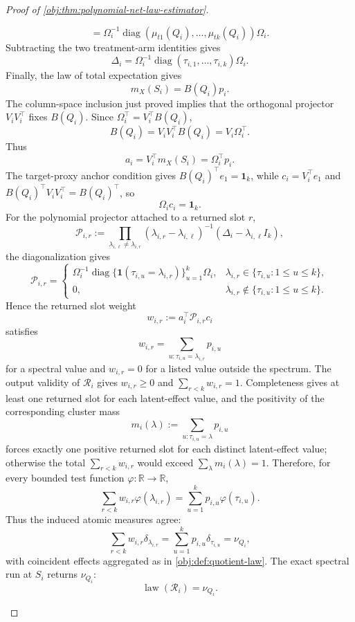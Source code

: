 \documentclass[11pt]{article}
\begin{document}
\begin{proof}[Proof of \cref{obj:thm:polynomial-net-law-estimator}]
\begin{enumerate}
\[=
\Omega_i^{-1}
\operatorname{diag}(\mu_{t1}(Q_i),\ldots,\mu_{tk}(Q_i))\Omega_i .
\]
Subtracting the two treatment-arm identities gives
\[
\Delta_i
=
\Omega_i^{-1}
\operatorname{diag}(\tau_{i,1},\ldots,\tau_{i,k})
\Omega_i .
\]
Finally, the law of total expectation gives
\[
m_X(S_i)=B(Q_i)p_i .
\]
The column-space inclusion just proved implies that the orthogonal projector
\(V_iV_i^\top\) fixes \(B(Q_i)\).  Since
\(\Omega_i^\top=V_i^\top B(Q_i)\),
\[
B(Q_i)=V_iV_i^\top B(Q_i)=V_i\Omega_i^\top .
\]
Thus
\[
a_i=V_i^\top m_X(S_i)=\Omega_i^\top p_i .
\]
The target-proxy anchor condition gives \(B(Q_i)^\top e_1=\mathbf 1_k\), while
\(c_i=V_i^\top e_1\) and \(B(Q_i)^\top V_iV_i^\top=B(Q_i)^\top\), so
\[
\Omega_i c_i=\mathbf 1_k .
\] %
For the polynomial projector attached to a returned slot \(r\),
\[
\mathcal P_{i,r}
:=
\prod_{\lambda_{i,\ell}\ne\lambda_{i,r}}
(\lambda_{i,r}-\lambda_{i,\ell})^{-1}
(\Delta_i-\lambda_{i,\ell}I_k),
\]
the diagonalization gives
\[
\mathcal P_{i,r}
=
\begin{cases}
\Omega_i^{-1}
\operatorname{diag}\{\mathbf 1(\tau_{i,u}=\lambda_{i,r})\}_{u=1}^k
\Omega_i,
&\lambda_{i,r}\in\{\tau_{i,u}:1\le u\le k\},\\
0,&\lambda_{i,r}\notin\{\tau_{i,u}:1\le u\le k\}.
\end{cases}
\]
Hence the returned slot weight
\[
w_{i,r}:=a_i^\top\mathcal P_{i,r}c_i
\]
satisfies
\[
w_{i,r}
=
\sum_{u:\tau_{i,u}=\lambda_{i,r}}p_{i,u}
\]
for a spectral value and \(w_{i,r}=0\) for a listed value outside the spectrum.
The output validity of \(\mathcal R_i\) gives \(w_{i,r}\ge0\) and
\(\sum_{r<k}w_{i,r}=1\).  Completeness gives at least one returned slot for
each latent-effect value, and the positivity of the corresponding cluster mass
\[
m_i(\lambda):=\sum_{u:\tau_{i,u}=\lambda}p_{i,u}
\]
forces exactly one positive returned slot for each distinct latent-effect
value; otherwise the total \(\sum_{r<k}w_{i,r}\) would exceed
\(\sum_{\lambda}m_i(\lambda)=1\).  Therefore, for every bounded test function
\(\varphi:\mathbb R\to\mathbb R\),
\[
\sum_{r<k}w_{i,r}\varphi(\lambda_{i,r})
=
\sum_{u=1}^k p_{i,u}\varphi(\tau_{i,u}).
\]
Thus the induced atomic measures agree:
\[
\sum_{r<k}w_{i,r}\delta_{\lambda_{i,r}}
=
\sum_{u=1}^kp_{i,u}\delta_{\tau_{i,u}}
=
\nu_{Q_i},
\]
with coincident effects aggregated as in \cref{obj:def:quotient-law}.  The exact
spectral run at \(S_i\) returns \(\nu_{Q_i}\):
\begin{equation}
\operatorname{law}(\mathcal R_i)=\nu_{Q_i}.
\label{eq:finite-net-run-quotient}
\end{equation} %


\end{enumerate}
\end{proof}
\end{document}
